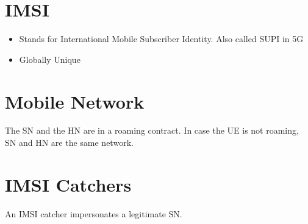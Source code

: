 \documentclass[portrait,a0]{a0poster}
\begin{document}
\begin{multicols}{2} %

\section{IMSI}

\begin{itemize} \Large
 \item Stands for International Mobile Subscriber Identity. Also called SUPI in 5G
 \item Globally Unique
\end{itemize}


\begin{center}
    
\end{center}


\section{Mobile Network}
The SN and the HN are in a roaming contract. In case the UE is not roaming, SN and HN are the same network.

\begin{center}
    
\end{center}




%    

                                                                                                                                                                     


\section{IMSI Catchers}

An IMSI catcher impersonates a legitimate SN.



\end{multicols}
\end{document}
